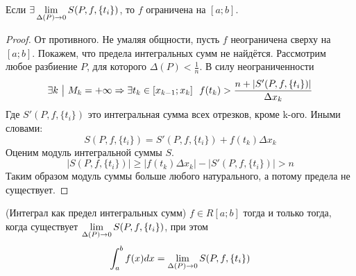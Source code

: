 \begin{lemma}
	Если $\exists \lim\limits_{\Delta(P) \to 0} S(P, f, \{t_i\})$, то $f$ ограничена на $[a; b]$.
\end{lemma}

\begin{proof}
	От противного. Не умаляя общности, пусть $f$ неограничена сверху на $[a; b]$. Покажем, что предела интегральных сумм не найдётся. Рассмотрим любое разбиение $P$, для которого $\Delta(P) < \frac{1}{n}$. В силу неограниченности
	\[
		\exists k \ \big|\  M_k = +\infty \Rightarrow \exists t_k \in [x_{k - 1}; x_k]\ \ f(t_k) > \frac{n + |S'(P, f, \{t_i\})|}{\Delta x_k}
	\]
	Где  $S'(P, f, \{t_i\})$ это интегральная сумма всех отрезков, кроме k-ого. Иными словами:
	\[
		S(P, f, \{t_i\}) = S'(P, f, \{t_i\}) + f(t_k) \Delta x_k
	\]
	Оценим модуль интегральной суммы $S$.
	\[
		|S(P, f, \{t_i\})| \ge |f(t_k) \Delta x_k| - |S'(P, f, \{t_i\})| > n
	\]
	Таким образом модуль суммы больше любого натурального,  а потому предела не существует.
\end{proof}

\begin{theorem} (Интеграл как предел интегральных сумм)
	$f \in R[a; b]$ тогда и только тогда, когда существует $\lim\limits_{\Delta(P) \to 0} S(P, f, \{t_i\})$, при этом
	\[
		\int_a^b f(x)dx = \lim\limits_{\Delta(P) \to 0} S(P, f, \{t_i\})
	\]
\end{theorem}

